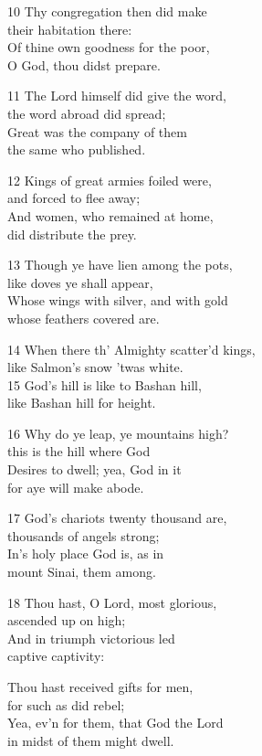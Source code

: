 \begin{multicols}{3}
10 Thy congregation then did make\\
their habitation there:\\
Of thine own goodness for the poor,\\
O God, thou didst prepare.

11 The Lord himself did give the word,\\
the word abroad did spread;\\
Great was the company of them\\
the same who published.

12 Kings of great armies foiled were,\\
and forced to flee away;\\
And women, who remained at home,\\
did distribute the prey.

13 Though ye have lien among the pots,\\
like doves ye shall appear,\\
Whose wings with silver, and with gold\\
whose feathers covered are.

14 When there th’ Almighty scatter’d kings,\\
like Salmon’s snow ’twas white.\\
15 God’s hill is like to Bashan hill,\\
like Bashan hill for height.

16 Why do ye leap, ye mountains high?\\
this is the hill where God\\
Desires to dwell; yea, God in it\\
for aye will make abode.

17 God’s chariots twenty thousand are,\\
thousands of angels strong;\\
In’s holy place God is, as in\\
mount Sinai, them among.

18 Thou hast, O Lord, most glorious,\\
ascended up on high;\\
And in triumph victorious led\\
captive captivity:

Thou hast received gifts for men,\\
for such as did rebel;\\
Yea, ev’n for them, that God the Lord\\
in midst of them might dwell.


\end{multicols}
